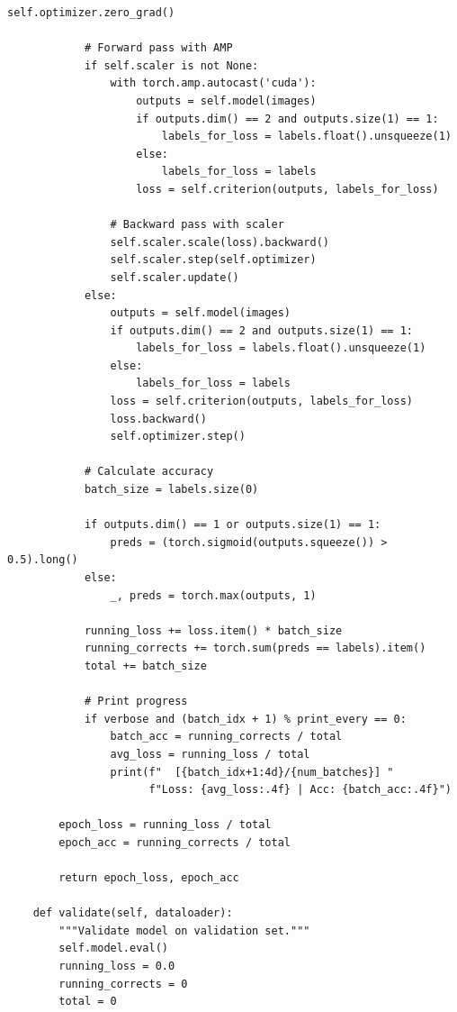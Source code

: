 \documentclass[man,12pt,letterpaper,donotrepeattitle,floatsintext]{apa7}
\begin{document}
\begin{lstlisting}[style=pythonstyle]
            self.optimizer.zero_grad()
            
            # Forward pass with AMP
            if self.scaler is not None:
                with torch.amp.autocast('cuda'):
                    outputs = self.model(images)
                    if outputs.dim() == 2 and outputs.size(1) == 1:
                        labels_for_loss = labels.float().unsqueeze(1)
                    else:
                        labels_for_loss = labels
                    loss = self.criterion(outputs, labels_for_loss)
                
                # Backward pass with scaler
                self.scaler.scale(loss).backward()
                self.scaler.step(self.optimizer)
                self.scaler.update()
            else:
                outputs = self.model(images)
                if outputs.dim() == 2 and outputs.size(1) == 1:
                    labels_for_loss = labels.float().unsqueeze(1)
                else:
                    labels_for_loss = labels
                loss = self.criterion(outputs, labels_for_loss)
                loss.backward()
                self.optimizer.step()
            
            # Calculate accuracy
            batch_size = labels.size(0)
            
            if outputs.dim() == 1 or outputs.size(1) == 1:
                preds = (torch.sigmoid(outputs.squeeze()) > 0.5).long()
            else:
                _, preds = torch.max(outputs, 1)
            
            running_loss += loss.item() * batch_size
            running_corrects += torch.sum(preds == labels).item()
            total += batch_size
            
            # Print progress
            if verbose and (batch_idx + 1) % print_every == 0:
                batch_acc = running_corrects / total
                avg_loss = running_loss / total
                print(f"  [{batch_idx+1:4d}/{num_batches}] "
                      f"Loss: {avg_loss:.4f} | Acc: {batch_acc:.4f}")
        
        epoch_loss = running_loss / total
        epoch_acc = running_corrects / total
        
        return epoch_loss, epoch_acc
    
    def validate(self, dataloader):
        """Validate model on validation set."""
        self.model.eval()
        running_loss = 0.0
        running_corrects = 0
        total = 0
        

\end{lstlisting}
\end{document}
